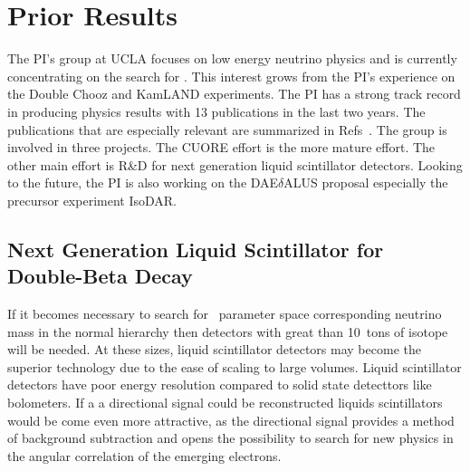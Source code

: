\section{Prior Results}

The PI's group at UCLA focuses on low energy neutrino physics and is currently concentrating on the search for \zeronu. This interest grows from the PI's experience on the Double Chooz and KamLAND experiments. The PI has a strong track record in producing physics results with 13 publications in the last two years.  The publications that are especially relevant are summarized in Refs~\cite{isodar,isodarscatt,pontecorvo,kamboron,qdot,qdot2013,direction2013,dcone,dctwo,dchydrogen,takahama}. The group is involved in three projects. The CUORE effort is the more mature effort. The other main effort is R\&D for next generation liquid scintillator detectors. Looking to the future, the PI is also working on the DAE$\delta$ALUS proposal especially the precursor experiment IsoDAR.

\subsection{Next Generation Liquid Scintillator for Double-Beta Decay}
If it becomes necessary to search for \zeronu~parameter space corresponding neutrino mass in the normal hierarchy then detectors with great than 10~tons of isotope will be needed. At these sizes, liquid scintillator detectors may become the superior technology due to the ease of scaling to large volumes\cite{biller}. Liquid scintillator detectors have poor energy resolution compared to solid state detecttors like bolometers. If a a directional signal could be reconstructed liquids scintillators would be come even more attractive, as the directional signal provides a method of background subtraction and opens the possibility to search for new physics in the angular correlation of the emerging electrons\cite{newphysics0nuBB}.  

